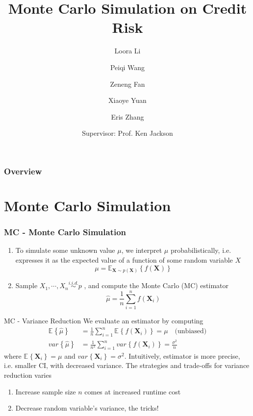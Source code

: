 \documentclass{beamer}
\title[]{Monte Carlo Simulation on Credit Risk}
\author[Loora, Peiqi]{Loora Li \and Peiqi Wang \and Zeneng Fan \and Xiaoye Yuan \and Eris Zhang}
\date[July 5th, 2018]{Supervisor: Prof. Ken Jackson }
\newcommand{\matr}[1]{\mathbf{#1}}
\newcommand{\E}[2][]{\mathbb{E}_{#1}\left\{#2\right\}}
\newcommand{\var}[2][]{var_{#1}\left\{#2\right\}}
\newcommand{\bX}{\matr{X}}
\begin{document}
\frame{\titlepage}
\begin{frame}
    \frametitle{Overview}
    \tableofcontents
\end{frame}


\section{Monte Carlo Simulation}


\begin{frame}
\frametitle{MC - Monte Carlo Simulation}
\begin{enumerate} 
    \item To simulate some unknown value $\mu$, we interpret $\mu$ probabilistically, i.e. expresses it as the expected value of a function of some random variable $X$
    \[
        \mu = \E[\bX \sim p(\bX)]{f(\bX)}
    \]
    \item Sample $X_1, \cdots, X_n \overset{i.i.d.}{\sim} p$ , and compute the Monte Carlo (MC) estimator
    \[
        \hat{\mu} = \frac{1}{n} \sum_{i=1}^n f(\bX_i)
    \]
\end{enumerate}    
\end{frame}




\begin{frame}{MC - Variance Reduction}
We evaluate an estimator by computing
\begin{align*}
    \E{\hat{\mu}} &= \frac{1}{n} \sum_{i=1}^n \E{f(\bX_i)} = \mu \quad \text{(unbiased)} \\ 
     \var{\hat{\mu}} &= \frac{1}{n^2}\sum_{i=1}^n \var{f(\bX_i)} = \frac{\sigma^2}{n}
\end{align*}
where $\E{\bX_i} = \mu$ and $\var{\bX_i}=\sigma^2$. Intuitively, estimator is more precise, i.e. smaller CI, with decreased variance. The strategies and trade-offs for variance reduction varies
\begin{enumerate}
    \item Increase sample size $n$ comes at increased runtime cost
    \item Decrease random variable's variance, the tricks!
\end{enumerate}
\end{frame}
\end{document}
